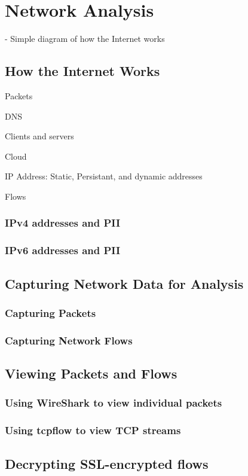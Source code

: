 \chapter{Network Analysis}
- Simple diagram of how the Internet works

\section{How the Internet Works}
Packets

DNS

Clients and servers

Cloud

IP Address: Static, Persistant, and dynamic addresses

Flows

\subsection{IPv4 addresses and PII}

\subsection{IPv6 addresses and PII}

\section{Capturing Network Data for Analysis}
\subsection{Capturing Packets}
\subsection{Capturing Network Flows}

\section{Viewing Packets and Flows}
\subsection{Using WireShark to view individual packets}
\subsection{Using tcpflow to view TCP streams}
\section{Decrypting SSL-encrypted flows}


